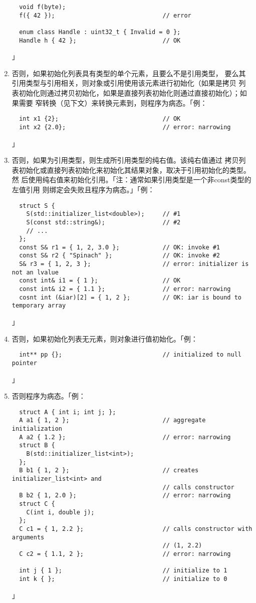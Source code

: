\begin{enumerate}
{\begin{lstlisting}
  void f(byte);
  f({ 42 });                              // error

  enum class Handle : uint32_t { Invalid = 0 };
  Handle h { 42 };                        // OK
\end{lstlisting}」}
  \item{否则，如果初始化列表具有类型的单个元素，且要么不是引用类型，
    要么其引用类型与引用相关，则对象或引用使用该元素进行初始化（如果是拷贝
    列表初始化则通过拷贝初始化，如果是直接列表初始化则通过直接初始化）；如果需要
    窄转换（见下文）来转换元素到，则程序为病态。「例：
\begin{lstlisting}
  int x1 {2};                             // OK
  int x2 {2.0};                           // error: narrowing
\end{lstlisting}」}
  \item{否则，如果为引用类型，则生成所引用类型的纯右值。该纯右值通过
    拷贝列表初始化或直接列表初始化来初始化其结果对象，取决于引用初始化的类型。然
    后使用纯右值来初始化引用。「注：通常如果引用类型是一个非const类型的左值引用
    则绑定会失败且程序为病态。」「例：
\begin{lstlisting}
  struct S {
    S(std::initializer_list<double>);     // #1
    S(const std::string&);                // #2
    // ...
  };
  const S& r1 = { 1, 2, 3.0 };            // OK: invoke #1
  const S& r2 { "Spinach" };              // OK: invoke #2
  S& r3 = { 1, 2, 3 };                    // error: initializer is not an lvalue
  const int& i1 = { 1 };                  // OK
  const int& i2 = { 1.1 };                // error: narrowing
  cosnt int (&iar)[2] = { 1, 2 };         // OK: iar is bound to temporary array
\end{lstlisting}」}
  \item{否则，如果初始化列表无元素，则对象进行值初始化。「例：
\begin{lstlisting}
  int** pp {};                            // initialized to null pointer
\end{lstlisting}」}
  \item{否则程序为病态。「例：
\begin{lstlisting}
  struct A { int i; int j; };
  A a1 { 1, 2 };                          // aggregate initialization
  A a2 { 1.2 };                           // error: narrowing
  struct B {
    B(std::initializer_list<int>);
  };
  B b1 { 1, 2 };                          // creates initializer_list<int> and
                                          // calls constructor
  B b2 { 1, 2.0 };                        // error: narrowing
  struct C {
    C(int i, double j);
  };
  C c1 = { 1, 2.2 };                      // calls constructor with arguments
                                          // (1, 2.2)
  C c2 = { 1.1, 2 };                      // error: narrowing

  int j { 1 };                            // initialize to 1
  int k { };                              // initialize to 0
\end{lstlisting}」}
\end{enumerate}

